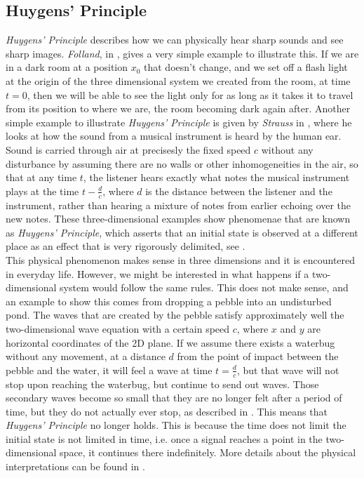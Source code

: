 \documentclass[a4paper, 12pt]{article}
\numberwithin{equation}{section}
\begin{document}
\subsection{Huygens' Principle}
\emph{Huygens' Principle} describes how we can physically hear sharp sounds and see sharp images. \emph{Folland}, in \cite{Fol}, gives a very simple example to illustrate 
this. If we are in a dark room at a position $x_0$ that doesn't change, and we set off a flash light at the origin of the three dimensional system we 
created from the room, at time $t=0$, then we will be able to see the light only for as long as it takes it to travel from its position to where we are, the room
becoming dark again after. Another simple example to illustrate \emph{Huygens' Principle} is given by \emph{Strauss} in \cite{Str}, where he looks at how the sound
from a musical instrument is heard by the human ear. Sound is carried through air at precisesly the fixed speed $c$ without any disturbance by assuming
there are no walls or other inhomogeneities in the air, so that at any time $t$, the listener hears exactly what notes the musical instrument plays at the time $t-\frac{d}{c}$,
where $d$ is the distance between the listener and the instrument, rather than hearing a mixture of notes from earlier echoing over the new notes. These three-dimensional 
examples show phenomenae that are known as \emph{Huygens' Principle}, which asserts that an initial state is observed at a different place as an effect that is 
very rigorously delimited, see \cite{Hil} .
\\

This physical phenomenon makes sense in three dimensions and it is encountered in everyday life. However, we might be interested in what happens if a two-dimensional system would follow
the same rules. This does not make sense, and an example to show this comes from dropping a pebble into an undisturbed pond. The waves that are created by the pebble satisfy 
approximately well the two-dimensional wave equation with a certain speed $c$, where $x$ and $y$ are horizontal coordinates of the 2D plane. If we assume there exists
a waterbug without any movement, at a distance $d$ from the point of impact between the pebble and the water, it will feel a wave at time $t=\frac{d}{c}$, but that wave will
not stop upon reaching the waterbug, but continue to send out waves. Those secondary waves become so small that they are no longer felt after a period of time, but they 
do not actually ever stop, as described in \cite{Str}. This means that \emph{Huygens' Principle} no longer holds. This is because the time does not limit the initial state is not limited 
in time, i.e. once a signal reaches a point in the two-dimensional space, it continues there indefinitely. More details about the physical interpretations can be found in \cite{Hil}.
\\
\end{document}
